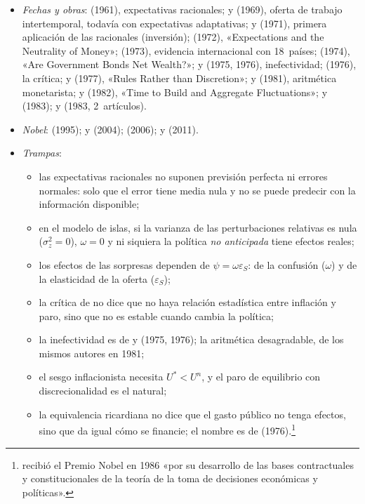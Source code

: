 \documentclass[11pt]{article}
\begin{document}
\begin{itemize}
\item \emph{Fechas y obras}:  (1961), expectativas racionales;  y  (1969), oferta de trabajo intertemporal, todavía con expectativas adaptativas;  y  (1971), primera aplicación de las racionales (inversión);  (1972), «Expectations and the Neutrality of Money»;  (1973), evidencia internacional con 18~países;  (1974), «Are Government Bonds Net Wealth?»;  y  (1975, 1976), inefectividad;  (1976), la crítica;  y  (1977), «Rules Rather than Discretion»;  y  (1981), aritmética monetarista;  y  (1982), «Time to Build and Aggregate Fluctuations»;  y  (1983);  y  (1983, 2~artículos).
\item \emph{Nobel}:  (1995);  y  (2004);  (2006);  y  (2011)\nocite{NobelPrize1995Lucas,Nobel2004KydlandPrescott,Nobel2011SargentSims}.
\item \emph{Trampas}:
  \begin{itemize}
  \item las expectativas racionales no suponen previsión perfecta ni errores normales: solo que el error tiene media nula y no se puede predecir con la información disponible;
  \item en el modelo de islas, si la varianza de las perturbaciones relativas es nula ($\sigma^2_z=0$), $\omega=0$ y ni siquiera la política \emph{no anticipada} tiene efectos reales;
  \item los efectos de las sorpresas dependen de $\psi=\omega\varepsilon_S$: de la confusión ($\omega$) y de la elasticidad de la oferta ($\varepsilon_S$);
  \item la crítica de  no dice que no haya relación estadística entre inflación y paro, sino que no es estable cuando cambia la política;
  \item la inefectividad es de  y  (1975, 1976); la aritmética desagradable, de los mismos autores en 1981;
  \item el sesgo inflacionista necesita $U^*<U^n$, y el paro de equilibrio con discrecionalidad es el natural;
  \item la equivalencia ricardiana no dice que el gasto público no tenga efectos, sino que da igual cómo se financie; el nombre es de  (1976).\footnote{ recibió el Premio Nobel en 1986 «por su desarrollo de las bases contractuales y constitucionales de la teoría de la toma de decisiones económicas y políticas»\nocite{Nobel1986Buchanan}.}
  \end{itemize}
\end{itemize}

\bibliografia
\end{document}
